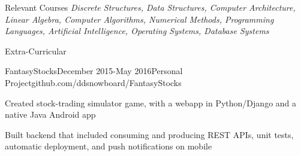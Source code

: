 \documentclass{resume} %
\begin{document}
    \begin{rSection}{Relevant Courses}
        \textit{Discrete Structures, Data Structures, Computer Architecture, Linear Algebra, Computer Algorithms, Numerical Methods, Programming Languages, Artificial Intelligence, Operating Systems, Database Systems}

    \end{rSection}


    \begin{rSection}{Extra-Curricular} \itemsep -3pt
        \begin{rSubsection}{FantasyStocks}{December 2015-May 2016}{Personal Project}{github.com/ddsnowboard/FantasyStocks}
        \item Created stock-trading simulator game, with a webapp in Python/Django and a native Java Android app
        \item Built backend that included consuming and producing REST APIs, unit tests, automatic deployment, and push notifications on mobile
        \end{rSubsection}

    \end{rSection}

    
\end{document}

